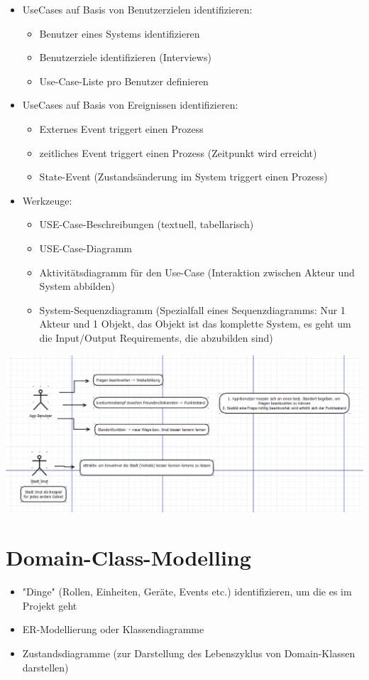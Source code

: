 \begin{itemize}
	\item UseCases auf Basis von Benutzerzielen identifizieren: 
	\begin{itemize}
		\item Benutzer eines Systems identifizieren
		\item Benutzerziele identifizieren (Interviews)
		\item Use-Case-Liste pro Benutzer definieren
	\end{itemize}
	\item UseCases auf Basis von Ereignissen identifizieren: 
	\begin{itemize}
		\item Externes Event triggert einen Prozess
		\item zeitliches Event triggert einen Prozess (Zeitpunkt wird erreicht) 
		\item State-Event (Zustandsänderung im System triggert einen Prozess)
	\end{itemize}
	\item Werkzeuge:
	\begin{itemize}
		\item USE-Case-Beschreibungen (textuell, tabellarisch)
		\item USE-Case-Diagramm
		\item Aktivitätsdiagramm für den Use-Case (Interaktion zwischen Akteur und System abbilden)
		\item System-Sequenzdiagramm (Spezialfall eines Sequenzdiagramms: Nur 1 Akteur und 1 Objekt, das Objekt ist das komplette System, es geht um die Input/Output Requirements, die abzubilden sind)
	\end{itemize}
\end{itemize}
\includegraphics[width=1.5\linewidth]{GeoRequest}



\section{Domain-Class-Modelling}
\begin{itemize}
	\item "Dinge" (Rollen, Einheiten, Geräte, Events etc.) identifizieren, um die es im Projekt geht
	\item ER-Modellierung oder Klassendiagramme
	\item Zustandsdiagramme (zur Darstellung des Lebenszyklus von Domain-Klassen darstellen)
\end{itemize}

